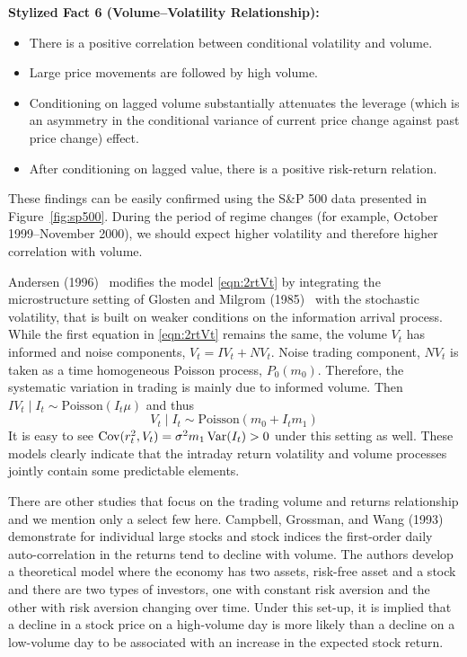 \noindent\textbf{Stylized Fact 6 (Volume--Volatility Relationship):} \label{in:style5}

        \begin{itemize}
        \item  There is a positive correlation between conditional volatility and volume.
        \item Large price movements are followed by high volume.
        \item Conditioning on lagged volume substantially attenuates the leverage (which is an asymmetry in the conditional variance of current price change against past price change) effect.
        \item After conditioning on lagged value, there is a positive risk-return relation.
        \end{itemize}


These findings can be easily confirmed using the S\&P 500 data presented in Figure~\ref{fig:sp500}. During the period of regime changes (for example, October 1999--November 2000), we should expect higher volatility and therefore higher correlation with volume. 


Andersen (1996)~\cite{andersen} modifies the model \eqref{eqn:2rtVt} by integrating the microstructure
setting of Glosten and Milgrom (1985)~\cite{glostenmilgrom} with the stochastic volatility, that is built on weaker conditions on the information arrival process. While the first equation in \eqref{eqn:2rtVt} remains the same, the volume $V_t$ has informed and noise components, $V_t = IV_t + NV_t$. Noise trading component, $NV_t$ is taken as a time homogeneous Poisson process, $P_0(m_0)$. Therefore, the systematic variation in trading is mainly due to informed volume. Then $IV_t \;|\; I_t \sim \text{Poisson}(I_t \mu)$ and thus
	\begin{equation} \label{eqn:2VtIt}
	V_t \;|\; I_t \sim \text{Poisson}(m_0 + I_t m_1)
	\end{equation}
It is easy to see $\operatorname{Cov}(r_t^2,V_t) = \sigma^2 m_1 \operatorname{Var}(I_t) > 0$ under this setting as well. These models clearly indicate that the intraday return volatility and volume processes jointly contain some predictable elements.


There are other studies that focus on the trading volume and returns relationship and we mention only a select few here. Campbell, Grossman, and Wang (1993)~\cite{campbellgross} demonstrate for individual large stocks and stock indices the first-order daily auto-correlation in the returns tend to decline with volume. The authors develop a theoretical model where the economy has two assets, risk-free asset and a stock and there are two types of investors, one with constant risk aversion and the other with risk aversion changing over time. Under this set-up, it is implied that a decline in a stock price on a high-volume day is more likely than a decline on a low-volume day to be associated with an increase in the expected stock return.


